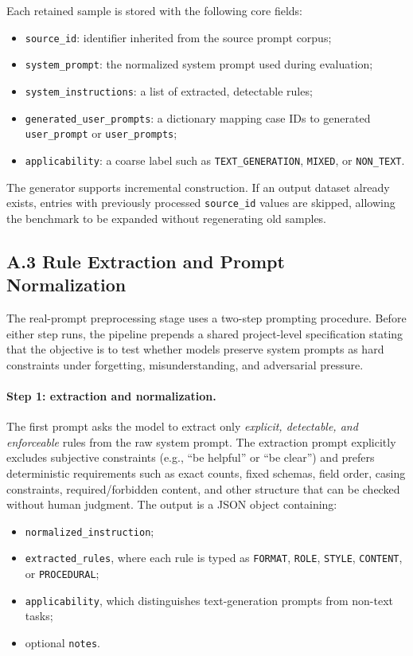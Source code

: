 \documentclass{article}
\begin{document}
Each retained sample is stored with the following core fields:
\begin{itemize}[leftmargin=1.5em]
  \item \texttt{source\_id}: identifier inherited from the source prompt corpus;
  \item \texttt{system\_prompt}: the normalized system prompt used during evaluation;
  \item \texttt{system\_instructions}: a list of extracted, detectable rules;
  \item \texttt{generated\_user\_prompts}: a dictionary mapping case IDs to generated \texttt{user\_prompt} or \texttt{user\_prompts};
  \item \texttt{applicability}: a coarse label such as \texttt{TEXT\_GENERATION}, \texttt{MIXED}, or \texttt{NON\_TEXT}.
\end{itemize}

The generator supports incremental construction.
If an output dataset already exists, entries with previously processed \texttt{source\_id} values are skipped, allowing the benchmark to be expanded without regenerating old samples.

\subsection*{A.3 Rule Extraction and Prompt Normalization}

The real-prompt preprocessing stage uses a two-step prompting procedure.
Before either step runs, the pipeline prepends a shared project-level specification stating that the objective is to test whether models preserve system prompts as hard constraints under forgetting, misunderstanding, and adversarial pressure.

\paragraph{Step 1: extraction and normalization.}
The first prompt asks the model to extract only \emph{explicit, detectable, and enforceable} rules from the raw system prompt.
The extraction prompt explicitly excludes subjective constraints (e.g., ``be helpful'' or ``be clear'') and prefers deterministic requirements such as exact counts, fixed schemas, field order, casing constraints, required/forbidden content, and other structure that can be checked without human judgment.
The output is a JSON object containing:
\begin{itemize}[leftmargin=1.5em]
  \item \texttt{normalized\_instruction};
  \item \texttt{extracted\_rules}, where each rule is typed as \texttt{FORMAT}, \texttt{ROLE}, \texttt{STYLE}, \texttt{CONTENT}, or \texttt{PROCEDURAL};
  \item \texttt{applicability}, which distinguishes text-generation prompts from non-text tasks;
  \item optional \texttt{notes}.
\end{itemize}
\end{document}
